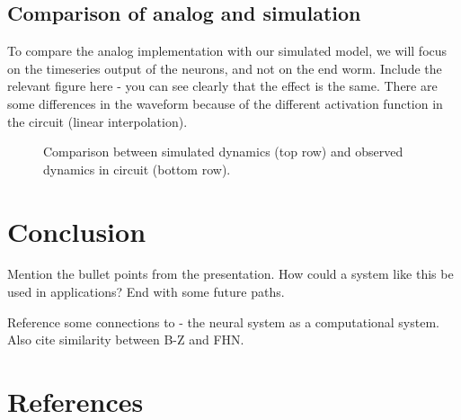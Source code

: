 \documentclass[
    11pt,
]{article}
\begin{document}
\subsection{Comparison of analog and simulation}

To compare the analog implementation with our simulated model, we will focus on the timeseries output of the neurons, and not on the end worm.  Include the relevant figure here - you can see clearly that the effect is the same.  There are some differences in the waveform because of the different activation function in the circuit (linear interpolation).

\begin{figure}[h!]
    \centering
    \pgfplotsset{}
    \caption{Comparison between simulated dynamics (top row) and observed dynamics in circuit (bottom row).}
    \label{fig: anal_sim_comp}
\end{figure}


\section{Conclusion}

Mention the bullet points from the presentation.  How could a system like this be used in applications?  End with some future paths.


Reference some connections to \citet{adamatzky2008} - the neural system as a computational system.  Also cite similarity between B-Z and FHN.

\section{References}

% 
\printbibliography[heading=none]
\end{document}
